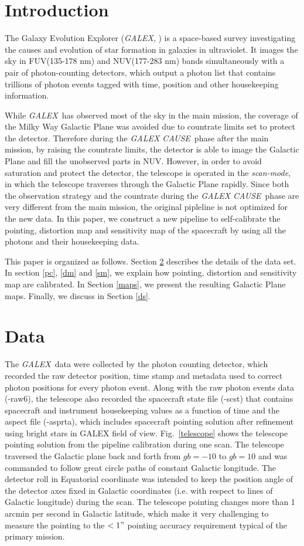 \documentclass[12pt, preprint]{aastex61}
\newcommand{\project}[1]{\textsl{#1}}
\newcommand{\galex}{\project{GALEX}}
\newcommand{\cause}{\project{GALEX CAUSE}}
\newcommand{\scanmode}{\project{scan-mode}}
\begin{document}
\section{Introduction}
The Galaxy Evolution Explorer (\galex, \citealt{galex1}) is a space-based survey investigating the causes and evolution of star formation in galaxies in ultraviolet. 
It images the sky in FUV(135-178 nm) and NUV(177-283 nm) bands simultaneously with a pair of photon-counting detectors, which output a photon list that contains trillions of photon events tagged with time, position and other housekeeping information.

While \galex\ has observed most of the sky in the main mission, the coverage of the Milky Way Galactic Plane was avoided due to countrate limits set to protect the detector.
Therefore during the \cause\ phase after the main mission, by raising the countrate limits, the detector is able to image the Galactic Plane and fill the unobserved parts in NUV.
However, in order to avoid saturation and protect the detector, the telescope is operated in the \scanmode, in which the telescope traverses through the Galactic Plane rapidly.
Since both the observation strategy and the countrate during the \cause\ phase are very different from the main mission, the original pipleline is not optimized for the new data.
In this paper, we construct a new pipeline to self-calibrate the pointing, distortion map and sensitivity map of the spacecraft by using all the photons and their housekeeping data.

This paper is organized as follows. 
Section \ref{data} describes the details of the data set.
In section \ref{pc}, \ref{dm} and \ref{sm}, we explain how pointing, distortion and sensitivity map are calibrated.
In Section \ref{maps}, we present the resulting Galactic Plane maps.
Finally, we discuss in Section \ref{ds}.

\section{Data}
\label{data}
The \galex\ data were collected by the photon counting detector, which recorded the raw detector position, time stamp and metadata used to correct photon positions for every photon event.
Along with the raw photon events data (-raw6), the telescope also recorded the spacecraft state file (-scst) that contains spacecraft and instrument housekeeping values as a function of time and the aspect file (-asprta), which includes spacecraft pointing solution after refinement using bright stars in GALEX field of view.
Fig.~\ref{telescope} shows the telescope pointing solution from the pipeline calibration during one scan.
The telescope traversed the Galactic plane back and forth from $gb=-10$ to $gb=10$ and was commanded to follow great circle paths of constant Galactic longitude.
The detector roll in Equatorial coordinate was intended to keep the position angle of the detector axes fixed in Galactic coordinates (i.e. with respect to lines of Galactic longitude) during the scan.
The telescope pointing changes more than 1 arcmin per second in Galactic latitude, which make it very challenging to measure the pointing to the $<1"$ pointing accuracy requirement typical of the primary mission.
\end{document}
